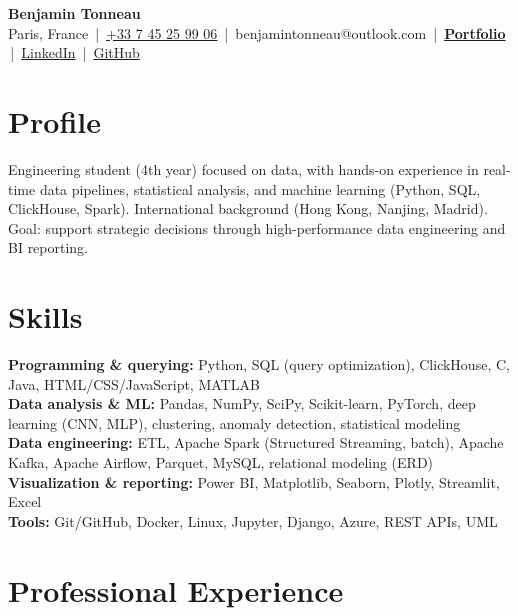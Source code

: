 \documentclass[10pt,a4paper]{article}
\newcommand{\secgap}{\vspace{3.5pt plus 1.5pt minus 1pt}}
\begin{document}
\enlargethispage{2cm}

\begin{center}
  {\LARGE \textbf{Benjamin Tonneau}}\\[2.5pt]
  Paris, France \,|\, \href{tel:+33745259906}{+33 7 45 25 99 06} \,|\, benjamintonneau@outlook.com \,|\, \href{https://tonneaubenjamin.github.io/Portfolio-Benjamin-Tonneau/}{\textbf{Portfolio}} \,|\, \href{https://linkedin.com/in/benjamin-tonneau}{LinkedIn} \,|\, \href{https://github.com/TonneauBenjamin}{GitHub}
\end{center}

\secgap
\section{Profile}
Engineering student (4th year) focused on data, with hands-on experience in real-time data pipelines, statistical analysis, and machine learning (Python, SQL, ClickHouse, Spark). International background (Hong Kong, Nanjing, Madrid). Goal: support strategic decisions through high-performance data engineering and BI reporting.

\secgap
\section{Skills}
\textbf{Programming \& querying:} Python, SQL (query optimization), ClickHouse, C, Java, HTML/CSS/JavaScript, MATLAB\\[1.5pt]
\textbf{Data analysis \& ML:} Pandas, NumPy, SciPy, Scikit-learn, PyTorch, deep learning (CNN, MLP), clustering, anomaly detection, statistical modeling\\[1.5pt]
\textbf{Data engineering:} ETL, Apache Spark (Structured Streaming, batch), Apache Kafka, Apache Airflow, Parquet, MySQL, relational modeling (ERD)\\[1.5pt]
\textbf{Visualization \& reporting:} Power BI, Matplotlib, Seaborn, Plotly, Streamlit, Excel\\[1.5pt]
\textbf{Tools:} Git/GitHub, Docker, Linux, Jupyter, Django, Azure, REST APIs, UML

\secgap
\section{Professional Experience}
\end{document}
